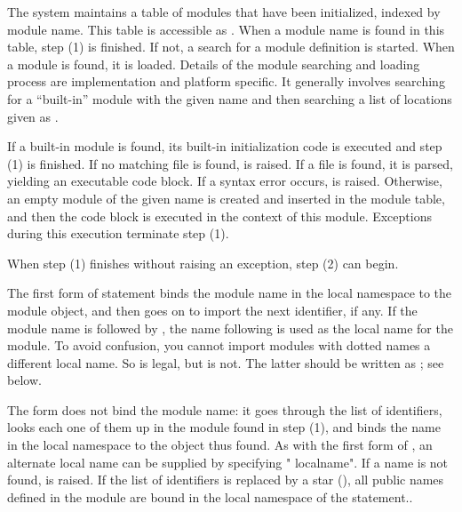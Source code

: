 The system maintains a table of modules that have been initialized,
indexed by module name.  This table is
accessible as .  When a module name is found in
this table, step (1) is finished.  If not, a search for a module
definition is started.  When a module is found, it is loaded.  Details
of the module searching and loading process are implementation and
platform specific.  It generally involves searching for a ``built-in''
module with the given name and then searching a list of locations
given as .

If a built-in module is found, its built-in initialization code is
executed and step (1) is finished.  If no matching file is found,
 is raised.  If a file is found, it is parsed,
yielding an executable code block.  If a syntax error occurs,
 is raised.  Otherwise, an empty module of the given
name is created and inserted in the module table, and then the code
block is executed in the context of this module.  Exceptions during
this execution terminate step (1).

When step (1) finishes without raising an exception, step (2) can
begin.

The first form of  statement binds the module name in
the local namespace to the module object, and then goes on to import
the next identifier, if any.  If the module name is followed by
, the name following  is used as the local
name for the module. To avoid confusion, you cannot import modules
with dotted names  a different local name. So  is legal, but  is not.
The latter should be written as ;
see below.

The  form does not bind the module name: it goes through the
list of identifiers, looks each one of them up in the module found in step
(1), and binds the name in the local namespace to the object thus found. 
As with the first form of , an alternate local name can be
supplied by specifying " localname".  If a name is not found,
 is raised.  If the list of identifiers is replaced
by a star (\character{*}), all public names defined in the module are
bound in the local namespace of the  statement..

